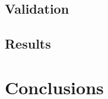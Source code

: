 \documentclass{article}
\begin{document}
	\subsection{Validation}
	\label{section:validation}
	
	\subsection{Results}
	\label{section:results}

\section{Conclusions}
\label{section:conclusions}



\end{document}
